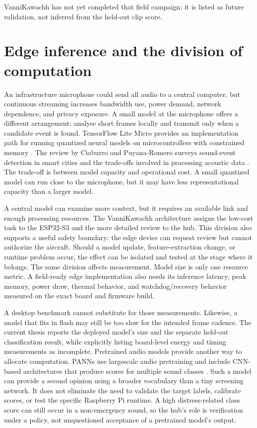 \documentclass[12pt,a4paper]{report}
\begin{document}
VanniKawachh has not yet completed that field campaign; it is listed as future validation, not inferred from the held-out clip score.

\section{Edge inference and the division of computation}

An infrastructure microphone could send all audio to a central computer, but continuous streaming increases bandwidth use, power demand, network dependence, and privacy exposure. A small model at the microphone offers a different arrangement: analyse short frames locally and transmit only when a candidate event is found. TensorFlow Lite Micro provides an implementation path for running quantized neural models on microcontrollers with constrained memory \cite{tflm}. The review by Ciaburro and Puyana-Romero surveys sound-event detection in smart cities and the trade-offs involved in processing acoustic data \cite{ciaburro}. The trade-off is between model capacity and operational cost. A small quantized model can run close to the microphone, but it may have less representational capacity than a larger model.

A central model can examine more context, but it requires an available link and enough processing resources. The VanniKawachh architecture assigns the low-cost task to the ESP32-S3 and the more detailed review to the hub. This division also supports a useful safety boundary: the edge device can request review but cannot authorize the aircraft. Should a model update, feature-extraction change, or runtime problem occur, the effect can be isolated and tested at the stage where it belongs. The same division affects measurement. Model size is only one resource metric. A field-ready edge implementation also needs its inference latency, peak memory, power draw, thermal behavior, and watchdog/recovery behavior measured on the exact board and firmware build.

A desktop benchmark cannot substitute for those measurements. Likewise, a model that fits in flash may still be too slow for the intended frame cadence. The current thesis reports the deployed model's size and the separate held-out classification result, while explicitly listing board-level energy and timing measurements as incomplete. Pretrained audio models provide another way to allocate computation. PANNs use largescale audio pretraining and include CNN-based architectures that produce scores for multiple sound classes \cite{panns}. Such a model can provide a second opinion using a broader vocabulary than a tiny screening network. It does not eliminate the need to validate the target labels, calibrate scores, or test the specific Raspberry Pi runtime. A high distress-related class score can still occur in a non-emergency sound, so the hub's role is verification under a policy, not unquestioned acceptance of a pretrained model's output.
\end{document}
